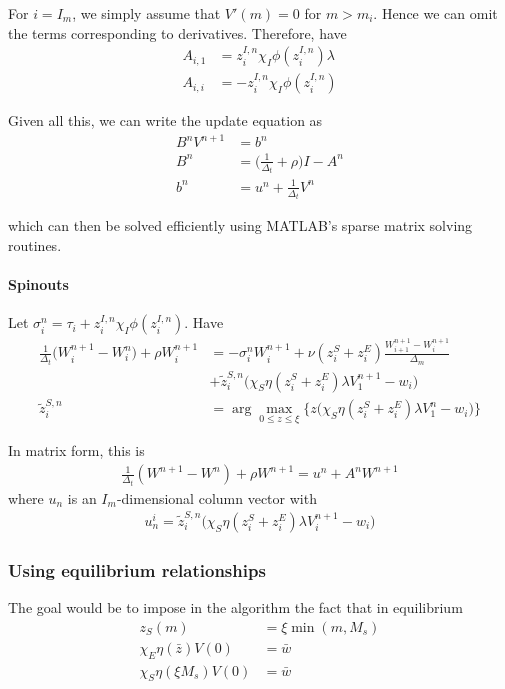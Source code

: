 \documentclass[12pt,english]{article}
\theoremstyle{remark}
\begin{document}
For $i = I_m$, we simply assume that $V'(m) = 0$ for $m > m_i$. Hence we can omit the terms corresponding to derivatives. Therefore, have
\begin{align*}
	A_{i,1} &= z_i^{I,n} \chi_I \phi (z_i^{I,n}) \lambda \\
	A_{i,i} &= -z_i^{I,n} \chi_I \phi (z_i^{I,n})
\end{align*}

Given all this, we can write the update equation as 
\begin{align*}
	B^n V^{n+1} &= b^n \\
	B^n &= \Big( \frac{1}{\Delta_t} + \rho \Big) I - A^n \\
	b^n &= u^n + \frac{1}{\Delta_t} V^n
\end{align*}

which can then be solved efficiently using MATLAB's sparse matrix solving routines.


\paragraph{Spinouts}
Let $\sigma_i^n = \tau_i + z_i^{I,n}\chi_I \phi(z_i^{I,n})$. Have 
\begin{align*}
\frac{1}{\Delta_t} \Big(W_i^{n+1} - W_i^n \Big) + \rho W_i^{n+1} &= -\sigma_i^n W_i^{n+1} + \nu(z_i^S + z_i^E) \frac{W_{i+1}^{n+1} - W_i^{n+1}}{\Delta_m} \\
&+ \tilde{z}_i^{S,n} \Big( \chi_S \eta (z_i^S + z_i^E) \lambda V_1^{n+1} - w_i \Big) \\
\tilde{z}_i^{S,n} &= \arg \max_{0 \le z \le \xi} \Big\{  z \Big( \chi_S \eta (z_i^S + z_i^E) \lambda V_1^{n} - w_i \Big)  \Big\}
\end{align*} 

In matrix form, this is
\begin{align*}
	\frac{1}{\Delta_t}(W^{n+1} - W^n) + \rho W^{n+1} = u^n + A^n W^{n+1}
\end{align*}
where $u_n$ is an $I_m$-dimensional column vector with 
\begin{align*}
	u_n^i = \tilde{z}_i^{S,n} \big( \chi_S \eta(z_i^S + z_i^E) \lambda V_i^{n+1} - w_i \big) 
\end{align*}

\subsubsection{Using equilibrium relationships}
The goal would be to impose in the algorithm the fact that in equilibrium 
\begin{align*}
z_S(m) &= \xi \min(m,M_s) \\
\chi_E \eta(\bar{z}) V(0) &= \bar{w} \\ 
\chi_S \eta(\xi M_s) V(0) &= \bar{w} 
\end{align*}
\end{document}
